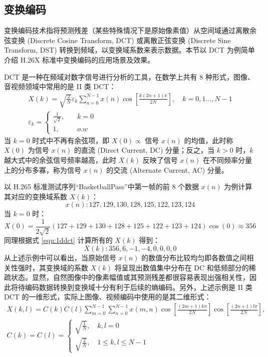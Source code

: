 \subsection{变换编码}
\label{cha:TransformOverview}
变换编码技术指将预测残差（某些特殊情况下是原始像素值）从空间域通过离散余弦变换 (Discrete Cosine Transform, DCT) 或离散正弦变换 (Discrete Sine Transform, DST) 转换到频域，以变换域系数来表示数据。本节以 DCT 为例简单介绍 H.26X 标准中变换编码的应用场景及效果。

DCT 是一种在频域对数字信号进行分析的工具，在数学上共有 8 种形式，图像、音视频领域中常用的是 II 类 DCT：
\begin{equation}
    \begin{gathered}
        X(k) = \sqrt{\frac{2}{N}}\varepsilon_{k}\sum_{n=0}^{N-1}x(n)\cos\left[\frac{k(2n+1)\pi}{2N}\right], \quad k=0,1...,N-1 \\
        \varepsilon_{k}= \left\{
        \begin{aligned}
            \frac{1}{\sqrt{2}}, \quad & k=0 \\
            1, \quad                  & o.w
        \end{aligned} \right.
    \end{gathered}
    \label{equ:1ddct}
\end{equation}
当 $k=0$ 时式中不再有余弦项，即 $X(0)\propto$ 信号 $x(n)$ 的均值，此时称 $X(0)$ 为信号 $x(n)$ 的直流 (Direct Current, DC) 分量；反之，当 $k>0$ 时，$k$ 越大式中的余弦信号频率越高，此时 $X(k)$ 反映了信号 $x(n)$ 在不同频率分量上的分布多寡，称为信号 $x(n)$ 的交流 (Alternate Current, AC) 分量。

以 H.265 标准测试序列“BasketballPass”中第一帧的前 8 个数据 $x(n)$ 为例计算其对应的变换域系数 $X(k)$：
\[
    x(n): 127,129,130,128,125,122,123,124
\]
当 $k=0$ 时：
\[
    X(0)=\frac{1}{2\sqrt{2}}(127+129+130+128+125+122+123+124)\cos(0)\approx 356
\]
同理根据式 \ref{equ:1ddct} 计算所有的 $X(k)$ 得到：
\[
    X(k): 356,6,-1,-4,0,0,0,0
\]
从上述示例中可以看出，当原始信号 $x(n)$ 的数值分布比较均匀即各数值之间相关性强时，其变换域的系数 $X(k)$ 将呈现出数值集中分布在 DC 和低频部分的稀疏状态。显然，自然图像中的像素幅值或其预测残差都很容易表现出强相关性，因此将待编码数据转换到变换域十分有利于后续的熵编码。另外，上述示例是 II 类 DCT 的一维形式，实际上图像、视频编码中使用的是其二维形式：
\begin{equation}
    \begin{gathered}
        X(k,l)=C(k)C(l)\sum_{m=0}^{N-1}\sum_{n=0}^{N-1}x(m,n)\cos\left[\frac{(2m+1)k\pi}{2N}\right]\cos\left[\frac{(2n+1)l\pi}{2N}\right], \\
        C(k)=C(l)=
        \begin{cases}
            \sqrt{\frac{1}{N}}, \quad k,l=0 \\
            \sqrt{\frac{2}{N}}, \quad 1 \leqslant k,l \leqslant N-1
        \end{cases}
    \end{gathered}
    \label{equ:2ddct}
\end{equation}

